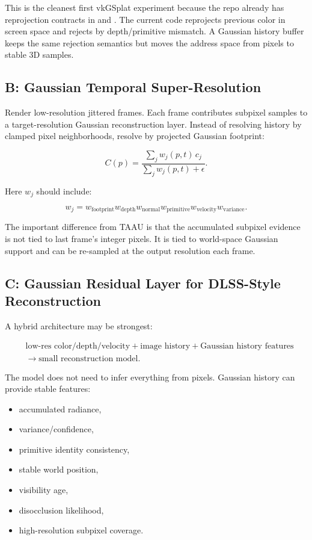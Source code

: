 \documentclass[11pt]{article}
\begin{document}
This is the cleanest first vkGSplat experiment because the repo already has
reprojection contracts in  and
. The current code reprojects previous color
in screen space and rejects by depth/primitive mismatch. A Gaussian history
buffer keeps the same rejection semantics but moves the address space from
pixels to stable 3D samples.

\subsection{B: Gaussian Temporal Super-Resolution}

Render low-resolution jittered frames. Each frame contributes subpixel samples
to a target-resolution Gaussian reconstruction layer. Instead of resolving
history by clamped pixel neighborhoods, resolve by projected Gaussian footprint:

\[
  C(p) =
  \frac{\sum_j w_j(p, t)\,c_j}
       {\sum_j w_j(p, t) + \epsilon}.
\]

Here $w_j$ should include:

\[
  w_j = w_{\mathrm{footprint}}
        w_{\mathrm{depth}}
        w_{\mathrm{normal}}
        w_{\mathrm{primitive}}
        w_{\mathrm{velocity}}
        w_{\mathrm{variance}}.
\]

The important difference from TAAU is that the accumulated subpixel evidence is
not tied to last frame's integer pixels. It is tied to world-space Gaussian
support and can be re-sampled at the output resolution each frame.

\subsection{C: Gaussian Residual Layer for DLSS-Style Reconstruction}

A hybrid architecture may be strongest:

\[
  \begin{aligned}
  &\text{low-res color/depth/velocity}
  + \text{image history}
  + \text{Gaussian history features}
  \\
  &\rightarrow
  \text{small reconstruction model}.
  \end{aligned}
\]

The model does not need to infer everything from pixels. Gaussian history can
provide stable features:

\begin{itemize}
  \item accumulated radiance,
  \item variance/confidence,
  \item primitive identity consistency,
  \item stable world position,
  \item visibility age,
  \item disocclusion likelihood,
  \item high-resolution subpixel coverage.
\end{itemize}
\end{document}
